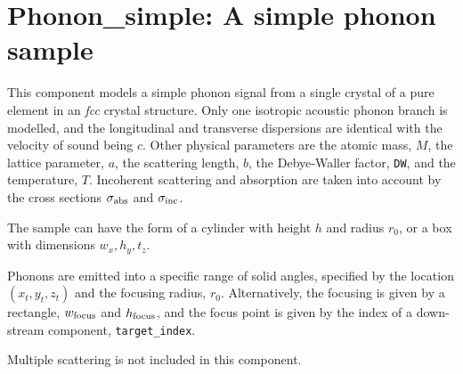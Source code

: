 \section{Phonon\_simple: A simple phonon sample}
\label{s:phonon_simple}


This component models a simple phonon signal from a single crystal of 
a pure element in an {\em fcc} crystal structure.
Only one isotropic acoustic phonon branch is modelled, and the longitudinal
and transverse dispersions are identical with the velocity of sound being $c$.
Other physical parameters are the atomic mass, $M$, the lattice parameter, $a$,
the scattering length, $b$,
the Debye-Waller factor, \verb+DW+, and the temperature, $T$.
Incoherent scattering and absorption are taken into account by the cross
sections $\sigma_{\rm abs}$ and $\sigma_{\rm inc}$.

The sample can have the form of a cylinder with height $h$ and radius
$r_0$, or a box with dimensions $w_x, h_y, t_z$. 

Phonons are emitted into a specific range of solid angles, specified 
by the location $(x_t, y_t, z_t)$ and the focusing radius, $r_0$.
Alternatively, the focusing is given by a rectangle, 
$w_{\rm focus}$ and $h_{\rm focus}$, and the focus point is given by the
index of a down-stream component, \verb+target_index+.

Multiple scattering is not included in this component. 

